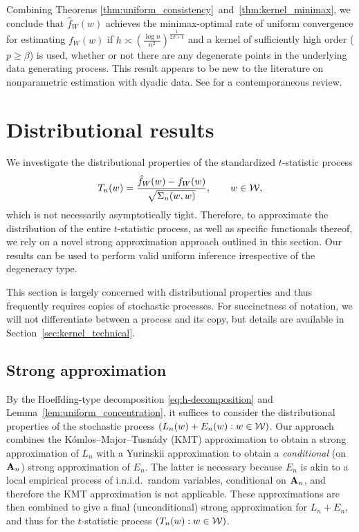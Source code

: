 Combining Theorems \ref{thm:uniform_consistency}~and~\ref{thm:kernel_minimax},
we conclude that $\hat{f}_W(w)$ achieves the minimax-optimal rate of uniform
convergence for estimating $f_W(w)$ if $h \asymp \left( \frac{\log n}{n^2}
\right)^{\frac{1}{2\beta+1}}$ and a kernel of sufficiently high order
($p \geq \beta$) is used, whether or not there are any degenerate points in the
underlying data generating process. This result appears to be new to the
literature on nonparametric estimation with dyadic data. See
\citet{gao2021minimax} for a contemporaneous review.

\section{Distributional results}\label{sec:kernel_inference}

We investigate the distributional properties of the
standardized $t$-statistic process
%
\[ T_n(w) = \frac{\hat{f}_W(w) - f_W(w)}{\sqrt{\Sigma_n(w,w)}}
, \qquad w\in\mathcal{W},\]
%
which is not necessarily asymptotically tight.
Therefore, to approximate the distribution of the entire $t$-statistic process,
as well as specific functionals thereof, we rely on a novel strong approximation
approach outlined in this section.
Our results can be used to perform valid uniform inference irrespective of the
degeneracy type.

This section is largely concerned with distributional properties and thus
frequently requires copies of stochastic processes.
For succinctness of notation, we will not differentiate between a process
and its copy, but details are available in
Section~\ref{sec:kernel_technical}.

\subsection{Strong approximation}

By the Hoeffding-type decomposition
\eqref{eq:h-decomposition} and Lemma~\ref{lem:uniform_concentration},
it suffices to consider the distributional properties
of the stochastic process $(L_n(w)+E_n(w):w\in\mathcal{W})$.
Our approach combines the K\'omlos--Major--Tusn\'ady (KMT) approximation
\citep{komlos1975approximation} to obtain a strong approximation of
$L_n$ with a Yurinskii approximation
\citep{yurinskii1978error} to obtain a
\emph{conditional} (on $\mathbf{A}_n$) strong approximation of
$E_n$.
The latter is necessary because
$E_n$ is akin to a local empirical process of i.n.i.d.\
random variables, conditional on $\mathbf{A}_n$,
and therefore the KMT approximation is not applicable.
These approximations are then combined to give a final
(unconditional) strong approximation for $L_n+E_n$,
and thus for the $t$-statistic process
$(T_n(w):w\in\mathcal{W})$.


